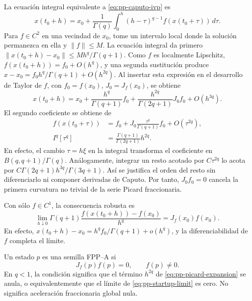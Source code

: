 La ecuación integral equivalente a \cref{eq:pp-caputo-ivp} es
\begin{equation}
 x(t_0+h)=x_0+\frac1{\Gamma(q)}
 \int_0^h(h-\tau)^{q-1}f(x(t_0+\tau))\,d\tau.
 \label{eq:pp-caputo-volterra-local}
\end{equation}
Para \(f\in C^2\) en una vecindad de \(x_0\), tome un intervalo local
donde la solución permanezca en ella y \(\|f\|\le M\). La ecuación
integral da primero
\(\|x(t_0+h)-x_0\|\le Mh^q/\Gamma(q+1)\). Como \(f\) es localmente
Lipschitz, \(f(x(t_0+h))=f_0+O(h^q)\), y una segunda sustitución produce
\(x-x_0=f_0h^q/\Gamma(q+1)+O(h^{2q})\). Al insertar esta expresión en
el desarrollo de Taylor de \(f\), con \(f_0=f(x_0)\), \(J_0=J_f(x_0)\),
se obtiene
\begin{equation}
 x(t_0+h)=x_0+
 \frac{h^q}{\Gamma(q+1)}f_0+
 \frac{h^{2q}}{\Gamma(2q+1)}J_0 f_0+
 O(h^{3q}).
 \label{eq:pp-picard-expansion}
\end{equation}
El segundo coeficiente se obtiene de
\begin{align}
 f(x(t_0+\tau))
 &=f_0+J_0\frac{\tau^q}{\Gamma(q+1)}f_0+O(\tau^{2q}),\\
 I^q[\tau^q]
 &=\frac{\Gamma(q+1)}{\Gamma(2q+1)}h^{2q}.
\end{align}
En efecto, el cambio \(\tau=h\xi\) en la integral transforma el
coeficiente en \(B(q,q+1)/\Gamma(q)\). Análogamente, integrar un resto
acotado por \(C\tau^{2q}\) lo acota por
\(C\Gamma(2q+1)h^{3q}/\Gamma(3q+1)\). Así se justifica el orden del
resto sin diferenciarlo ni componer derivadas de Caputo.
Por tanto, \(J_0 f_0=0\) cancela la primera curvatura no trivial de la serie
Picard fraccionaria.

Con sólo \(f\in C^1\), la consecuencia robusta es
\begin{equation}
 \lim_{h\downarrow0}
 \Gamma(q+1)
 \frac{f(x(t_0+h))-f(x_0)}{h^q}
 =J_f(x_0)f(x_0).
 \label{eq:pp-startup-limit}
\end{equation}
En efecto,
\(x(t_0+h)-x_0=h^qf_0/\Gamma(q+1)+o(h^q)\), y la
diferenciabilidad de \(f\) completa el límite.

\begin{definition}
Un estado \(p\) es una semilla FPP--A si
\begin{equation}
 J_f(p)f(p)=0,\qquad f(p)\neq0.
 \label{eq:fppa-definition}
\end{equation}
En \(q<1\), la condición significa que el término \(h^{2q}\) de
\cref{eq:pp-picard-expansion} se anula, o equivalentemente que el límite de
\cref{eq:pp-startup-limit} es cero. No significa aceleración fraccionaria
global nula.
\end{definition}

